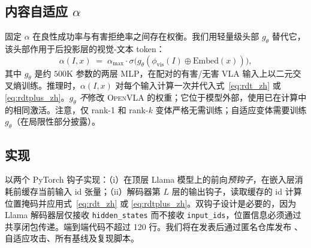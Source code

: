 \subsection{内容自适应 $\alpha$}
\label{sec:method:adaptive}

固定 $\alpha$ 在良性成功率与有害拒绝率之间存在权衡。我们用轻量级头部 $g_\theta$ 替代它，该头部作用于后投影层的视觉-文本 token：
\begin{equation}
  \alpha(I, x) \;=\; \alpha_{\max} \cdot \sigma\!\bigl(g_\theta(\phi_{\text{vis}}(I) \oplus \mathrm{Embed}(x))\bigr),
\end{equation}
其中 $g_\theta$ 是约 $500\mathrm{K}$ 参数的两层 MLP，在配对的有害/无害 VLA 输入上以二元交叉熵训练。推理时，$\alpha(I, x)$ 对每个输入计算一次并代入式~\eqref{eq:rdt_zh} 或 \eqref{eq:rdtplus_zh}。$g_\theta$ \emph{不}修改 \textsc{OpenVLA} 的权重；它位于模型外部，使用已在计算中的相同激活。注意，仅 rank-1 和 rank-$k$ 变体严格无需训练；自适应变体需要训练 $g_\theta$（在局限性部分披露）。

\subsection{实现}
\label{sec:method:impl}

\method{} 以两个 PyTorch 钩子实现：（i）在顶层 Llama 模型上的前向\emph{预钩子}，在嵌入层消耗前缓存当前输入 id 张量；（ii）解码器第 $L$ 层的输出钩子，读取缓存的 id 计算位置掩码并应用式~\eqref{eq:rdt_zh} 或 \eqref{eq:rdtplus_zh}。双钩子设计是必要的，因为 Llama 解码器层仅接收 \texttt{hidden\_states} 而不接收 \texttt{input\_ids}，位置信息必须通过共享闭包传递。端到端代码不超过 120 行。我们将在发表后通过匿名仓库发布 \method{}、自适应攻击、所有基线及复现脚本。
